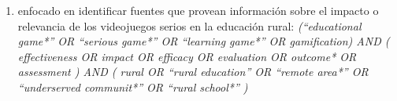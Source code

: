\begin{enumerate}[label=\textbf{Cadena \arabic*},leftmargin=6em]
    \item enfocado en identificar fuentes que provean información sobre el impacto o relevancia de los videojuegos serios en la educación rural: \textit{(``educational game*'' OR ``serious game*'' OR ``learning game*'' OR gamification) AND ( effectiveness OR impact OR efficacy OR evaluation OR outcome* OR assessment ) AND ( rural OR ``rural education'' OR ``remote area*'' OR ``underserved communit*'' OR ``rural school*'' )}

\end{enumerate}


